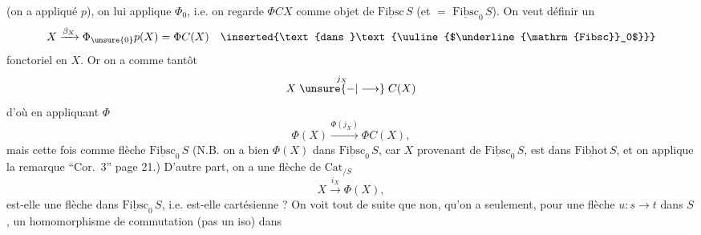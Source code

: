 (on a appliqué $p$), on lui applique $\Phi_0$,  i.e. on regarde $\Phi C X$ comme objet de $\underline{\mathrm{Fibsc}}\,S$ (et $=$  $\underline{\mathrm{Fibsc}}_0\,S$). On veut définir un 
\[
 X\xrightarrow{\beta_X}\Phi_{\unsure{0}}p(X)=\Phi C(X)\quad\inserted{\text{dans }\text{\uuline{$\underline{\mathrm{Fibsc}}_0$}}}
\]
fonctoriel en $X$. Or on a comme tantôt
\[
 X\mathrel{\overset{j_X}{\unsure{\mathord{-}|\longrightarrow}}} C(X)
\]
d'où en appliquant $\Phi$
\[
 \Phi(X)\xrightarrow{\Phi(j_X)}\Phi C(X),
\]
mais  cette fois comme flèche  $\underline{\mathrm{Fibsc}}_0\,S$  (N.B. on a bien $\Phi(X)$ dans $\underline{\mathrm{Fibsc}}_0\,S$, car $X$  provenant de $\underline{\mathrm{Fibsc}}_0\,S$,  est dans $\underline{\mathrm{Fibhot}}\,S$, et on applique la remarque ``Cor.~3'' page 21.) D'autre part, on a une flèche de $\mathrm{Cat}_{/S}$
\[
 X\xrightarrow{i_X}\Phi(X),
\]
est-elle une flèche dans $\underline{\mathrm{Fibsc}}_0\,S$, i.e. est-elle cartésienne ? On voit tout de suite que non, qu'on a seulement, pour une flèche $u:s\longrightarrow t$ dans $S$, un homomorphisme de commutation (pas un iso) dans
